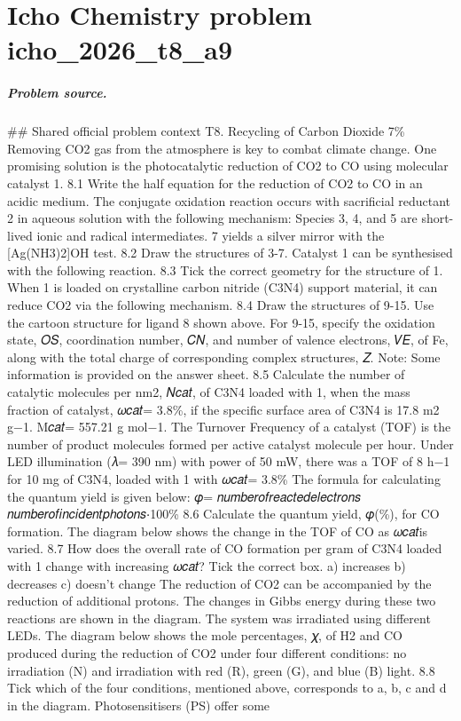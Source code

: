 
\chapter{Icho Chemistry problem icho\_2026\_t8\_a9}
\label{ch:IChO2026Problems_problem_icho_2026_t8_a9}

\paragraph{Problem source.}
\#\# Shared official problem context
T8. Recycling of Carbon Dioxide 7\% Removing CO2 gas from the atmosphere is key to combat climate change. One promising solution is the photocatalytic reduction of CO2 to CO using molecular catalyst 1. 8.1 Write the half equation for the reduction of CO2 to CO in an acidic medium. The conjugate oxidation reaction occurs with sacrificial reductant 2 in aqueous solution with the following mechanism: Species 3, 4, and 5 are short-lived ionic and radical intermediates. 7 yields a silver mirror with the [Ag(NH3)2]OH test. 8.2 Draw the structures of 3-7. Catalyst 1 can be synthesised with the following reaction. 8.3 Tick the correct geometry for the structure of 1. When 1 is loaded on crystalline carbon nitride (C3N4) support material, it can reduce CO2 via the following mechanism. 8.4 Draw the structures of 9-15. Use the cartoon structure for ligand 8 shown above. For 9-15, specify the oxidation state, 𝑂𝑆, coordination number, 𝐶𝑁, and number of valence electrons, 𝑉𝐸, of Fe, along with the total charge of corresponding complex structures, 𝑍. Note: Some information is provided on the answer sheet. 8.5 Calculate the number of catalytic molecules per nm2, 𝑁𝑐𝑎𝑡, of C3N4 loaded with 1, when the mass fraction of catalyst, 𝜔𝑐𝑎𝑡= 3.8\%, if the specific surface area of C3N4 is 17.8 m2 g−1. M𝑐𝑎𝑡= 557.21 g mol−1. The Turnover Frequency of a catalyst (TOF) is the number of product molecules formed per active catalyst molecule per hour. Under LED illumination (𝜆= 390 nm) with power of 50 mW, there was a TOF of 8 h−1 for 10 mg of C3N4, loaded with 1 with 𝜔𝑐𝑎𝑡= 3.8\% The formula for calculating the quantum yield is given below: 𝜑= 𝑛𝑢𝑚𝑏𝑒𝑟𝑜𝑓𝑟𝑒𝑎𝑐𝑡𝑒𝑑𝑒𝑙𝑒𝑐𝑡𝑟𝑜𝑛𝑠 𝑛𝑢𝑚𝑏𝑒𝑟𝑜𝑓𝑖𝑛𝑐𝑖𝑑𝑒𝑛𝑡𝑝ℎ𝑜𝑡𝑜𝑛𝑠⋅100\% 8.6 Calculate the quantum yield, 𝜑(\%), for CO formation. The diagram below shows the change in the TOF of CO as 𝜔𝑐𝑎𝑡is varied. 8.7 How does the overall rate of CO formation per gram of C3N4 loaded with 1 change with increasing 𝜔𝑐𝑎𝑡? Tick the correct box. a) increases b) decreases c) doesn't change The reduction of CO2 can be accompanied by the reduction of additional protons. The changes in Gibbs energy during these two reactions are shown in the diagram. The system was irradiated using different LEDs. The diagram below shows the mole percentages, 𝜒, of H2 and CO produced during the reduction of CO2 under four different conditions: no irradiation (N) and irradiation with red (R), green (G), and blue (B) light. 8.8 Tick which of the four conditions, mentioned above, corresponds to a, b, c and d in the diagram. Photosensitisers (PS) offer some 